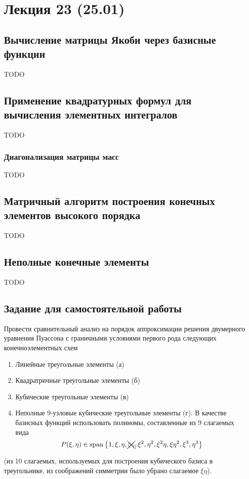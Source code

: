 \section{Лекция 23 (25.01)}

\subsection{Вычисление матрицы Якоби через базисные функции}
TODO

\subsection{Применение квадратурных формул для вычисления элементных интегралов}
TODO
\subsubsection{Диагонализация матрицы масс}
TODO

\subsection{Матричный алгоритм построения конечных элементов высокого порядка}
TODO

\subsection{Неполные конечные элементы}
TODO

\subsection{Задание для самостоятельной работы}
Провести сравнительный анализ на порядок аппроксимации решения двумерного
уравнения Пуассона с граничными условиями первого рода
следующих конечноэлементных схем
\begin{enumerate}
\item
Линейные треугольные элементы (а)
\item
Квадратричные треугольные элементы (б)
\item
Кубические треугольные элементы (в)
\item
Неполные 9-узловые кубические треугольные элементы (г). В качестве базисных функций использовать полиномы,
составленные из 9 слагаемых вида
$$
P(\xi, \eta) \in
\rm{span}\left\{1, \xi, \eta, \xcancel{\color{gray} \xi \eta}, \xi^2, \eta^2, \xi^2\eta, \xi\eta^2, \xi^3, \eta^3 \right\}
$$
\end{enumerate}
(из 10 слагаемых, используемых для построения кубического базиса в треугольнике,
из соображений симметрии было убрано слагаемое $\xi\eta$).

